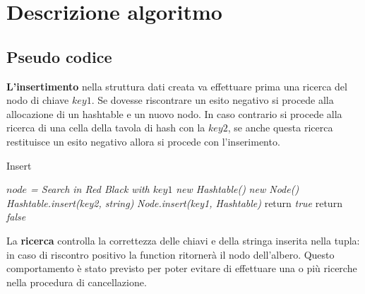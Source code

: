 \def\baselinestretch{1}
\section{Descrizione algoritmo}
\def\baselinestretch{1.66}
\thispagestyle{headings}
\subsection{Pseudo codice}

\textbf{L'insertimento} nella struttura dati creata va effettuare prima una ricerca
del nodo di chiave $key1$. Se dovesse riscontrare un esito negativo si procede
alla allocazione di un hashtable e un nuovo nodo. In caso contrario si procede alla ricerca
di una cella della tavola di hash con la $key2$, se anche questa ricerca restituisce un esito
negativo allora si procede con l'inserimento.

\BlankLine
\IncMargin{1.5em}
\begin{algorithm}[H]
\caption{Insert}
\emph{$node$ = Search in Red Black with $key1$}\;
 {
    \emph{new Hashtable()}\;
    \emph{new Node()}\;
    \emph{Hashtable.insert(key2, string)}\;
    \emph{Node.insert(key1, Hashtable)}\;
    return \emph{true}\;
}
return \emph{false}\;
\end{algorithm}

\indent La \textbf{ricerca} controlla la correttezza delle chiavi e della stringa inserita nella tupla:
in caso di riscontro positivo la function ritorner\`a il nodo dell'albero. Questo comportamento \`e stato previsto
per poter evitare di effettuare una o pi\`u ricerche nella
procedura di cancellazione.

